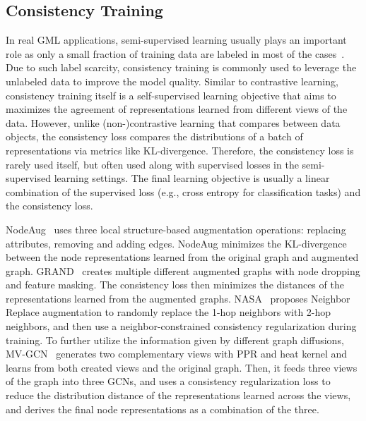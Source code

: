 \documentclass[11pt]{article}
\begin{document}
\subsection{Consistency Training}
\label{sec:consistent}

In real GML applications, semi-supervised learning usually plays an important role as only a small fraction of training data are labeled in most of the cases~\cite{wu2020comprehensive}. Due to such label scarcity, consistency training is commonly used to leverage the unlabeled data to improve the model quality. Similar to contrastive learning, consistency training itself is a self-supervised learning objective that aims to maximizes the agreement of representations learned from different views of the data. However, unlike (non-)contrastive learning that compares between data objects, the consistency loss compares the distributions of a batch of representations via metrics like KL-divergence. Therefore, the consistency loss is rarely used itself, but often used along with supervised losses in the semi-supervised learning settings. The final learning objective is usually a linear combination of the supervised loss (e.g., cross entropy for classification tasks) and the consistency loss.

NodeAug~\cite{wang2020nodeaug} uses three local structure-based augmentation operations: replacing attributes, removing and adding edges. NodeAug minimizes the KL-divergence between the node representations learned from the original graph and augmented graph. GRAND~\cite{feng2020graph} creates multiple different augmented graphs with node dropping and feature masking. The consistency loss then minimizes the distances of the representations learned from the augmented graphs. 
NASA~\cite{bo2022regularizing} proposes Neighbor Replace augmentation to randomly replace the 1-hop neighbors with 2-hop neighbors, and then use a neighbor-constrained consistency regularization during training.
To further utilize the information given by different graph diffusions, MV-GCN~\cite{yuan2021semi} generates two complementary views with PPR and heat kernel and learns from both created views and the original graph. Then, it feeds three views of the graph into three GCNs, and uses a consistency regularization loss to reduce the distribution distance of the representations learned across the views, and derives the final node representations as a  combination of the three.
\end{document}
